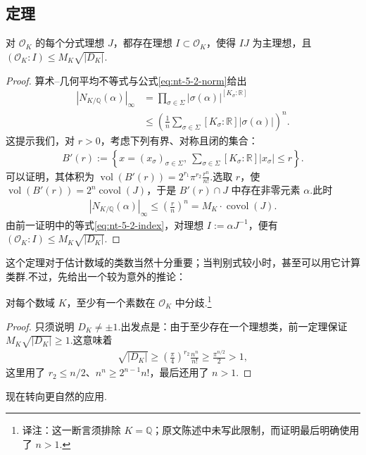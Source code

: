 \subsection{定理}\label{sec:nt-5-2-3}
对 $\mathcal O_K$ 的每个分式理想 $J$，都存在理想 $I\subset\mathcal O_K$，使得 $IJ$ 为主理想，且 $(\mathcal O_K:I)\le M_K\sqrt{|D_K|}$.
\begin{proof}
算术--几何平均不等式与公式\eqref{eq:nt-5-2-norm}给出
\begin{align*}
|N_{K/\mathbb Q}(\alpha)|_\infty&=\prod_{\sigma\in\Sigma}|\sigma(\alpha)|^{[K_\sigma:\mathbb R]}\\
&\le\left(\frac1n\sum_{\sigma\in\Sigma}[K_\sigma:\mathbb R]|\sigma(\alpha)|\right)^n.
\end{align*}
这提示我们，对 $r>0$，考虑下列有界、对称且闭的集合：
\begin{align*}
B'(r):=\left\{x=(x_\sigma)_{\sigma\in\Sigma},\ \sum_{\sigma\in\Sigma}[K_\sigma:\mathbb R]|x_\sigma|\le r\right\}.
\end{align*}
可以证明，其体积为 $\operatorname{vol}(B'(r))=2^{r_1}\pi^{r_2}\frac{r^n}{n!}$.选取 $r$，使 $\operatorname{vol}(B'(r))=2^n\operatorname{covol}(J)$，于是 $B'(r)\cap J$ 中存在非零元素 $\alpha$.此时
\begin{align*}
|N_{K/\mathbb Q}(\alpha)|_\infty\le\left(\frac rn\right)^n=M_K\cdot\operatorname{covol}(J).
\end{align*}
由前一证明中的等式\eqref{eq:nt-5-2-index}，对理想 $I:=\alpha J^{-1}$，便有 $(\mathcal O_K:I)\le M_K\sqrt{|D_K|}$.
\end{proof}
这个定理对于估计数域的类数当然十分重要；当判别式较小时，甚至可以用它计算类群.不过，先给出一个较为意外的推论：
\begin{corollary*}\label{cor:nt-5-2-ramified-prime}
对每个数域 $K$，至少有一个素数在 $\mathcal O_K$ 中分歧.\footnote{译注：这一断言须排除 $K=\mathbb Q$；原文陈述中未写此限制，而证明最后明确使用了 $n>1$.}
\end{corollary*}
\begin{proof}
只须说明 $D_K\ne\pm1$.出发点是：由于至少存在一个理想类，前一定理保证 $M_K\sqrt{|D_K|}\ge1$.这意味着
\begin{align*}
\sqrt{|D_K|}\ge\left(\frac\pi4\right)^{r_2}\frac{n^n}{n!}\ge\frac{\pi^{n/2}}2>1,
\end{align*}
这里用了 $r_2\le n/2$、$n^n\ge2^{n-1}n!$，最后还用了 $n>1$.
\end{proof}
现在转向更自然的应用.
